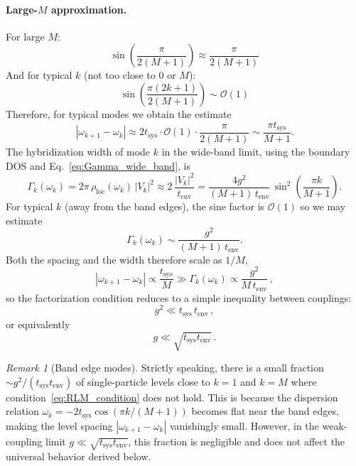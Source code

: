 \documentclass[12pt,oneside,openright]{report}
\theoremstyle{definition}
\theoremstyle{plain}
\theoremstyle{remark}
\newtheorem{remark}{Remark}[chapter]
\begin{document}
\paragraph{Large-$M$ approximation.}
For large $M$:
\begin{equation}
\sin\left(\frac{\pi}{2(M+1)}\right) \approx \frac{\pi}{2(M+1)}
\end{equation}
And for typical $k$ (not too close to 0 or $M$):
\begin{equation}
\sin\left(\frac{\pi(2k+1)}{2(M+1)}\right) \sim \mathcal{O}(1)
\end{equation}
Therefore, for typical modes we obtain the estimate
\begin{equation}
|\omega_{k+1} - \omega_k| \approx 2t_{\text{sys}} \cdot \mathcal{O}(1) \cdot \frac{\pi}{2(M+1)} \sim \frac{\pi t_{\text{sys}}}{M+1}.
\end{equation}
The hybridization width of mode $k$ in the wide-band limit, using the boundary DOS and Eq.~\eqref{eq:Gamma_wide_band}, is
\begin{equation}
\Gamma_k(\omega_k) = 2\pi\,\rho_{\mathrm{loc}}(\omega_k)\,|V_k|^2
\approx 2\,\frac{|V_k|^2}{t_{\text{env}}}
= \frac{4 g^2}{(M+1)\, t_{\text{env}}}\, \sin^2\!\left(\frac{\pi k}{M+1}\right).
\end{equation}
For typical $k$ (away from the band edges), the sine factor is $\mathcal{O}(1)$ so we may estimate
\begin{equation}
\Gamma_k(\omega_k) \sim \frac{g^2}{(M+1)\,t_{\text{env}}}.
\end{equation}
Both the spacing and the width therefore scale as $1/M$,
\begin{equation}
|\omega_{k+1} - \omega_k| \propto \frac{t_{\text{sys}}}{M} \gg \Gamma_k(\omega_k) \propto \frac{g^2}{M\,t_{\text{env}}}\,, \label{eq:RLM_condition}
\end{equation}
so the factorization condition reduces to a simple inequality between couplings:
\begin{equation}
g^2 \ll t_{\text{sys}}\, t_{\text{env}}\,,
\end{equation}
or equivalently
\begin{equation}
g \ll \sqrt{t_{\text{sys}} t_{\text{env}}}\,.
\label{eq:RLM_condition_conclusion}
\end{equation}

\begin{remark}[Band edge modes]
Strictly speaking, there is a small fraction $\sim g^2/(t_{\mathrm{sys}} t_{\mathrm{env}})$ of single-particle levels 
close to $k = 1$ and $k = M$ where condition~\eqref{eq:RLM_condition} does not hold. This is because the 
dispersion relation $\omega_k = -2t_{\mathrm{sys}}\cos(\pi k/(M+1))$ becomes flat near the band edges, making the 
level spacing $|\omega_{k+1} - \omega_k|$ vanishingly small. However, in the weak-coupling limit 
$g \ll \sqrt{t_{\mathrm{sys}} t_{\mathrm{env}}}$, this fraction is negligible and does not affect the universal 
behavior derived below.
\end{remark}
\end{document}
